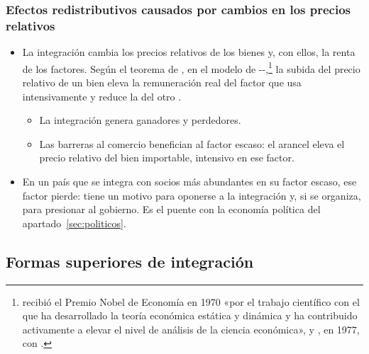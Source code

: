 \documentclass[11pt]{article}
\begin{document}
\subsubsection{Efectos redistributivos causados por cambios en los precios relativos}\label{sec:redistributivos}

\begin{itemize}
\item La integración cambia los precios relativos de los bienes y, con ellos, la renta de los factores. Según el teorema de \textcite{StolperSamuelson1941Protection}, en el modelo de --,\footnote{ recibió el Premio Nobel de Economía en 1970 «por el trabajo científico con el que ha desarrollado la teoría económica estática y dinámica y ha contribuido activamente a elevar el nivel de análisis de la ciencia económica»\nocite{Nobel1970Samuelson}, y , en 1977, con \nocite{Nobel1977MeadeOhlin}.} la subida del precio relativo de un bien eleva la remuneración real del factor que usa intensivamente y reduce la del otro .
  \begin{itemize}
  \item La integración genera ganadores y perdedores.
  \item Las barreras al comercio benefician al factor escaso: el arancel eleva el precio relativo del bien importable, intensivo en ese factor.
  \end{itemize}
\item En un país que se integra con socios más abundantes en su factor escaso, ese factor pierde: tiene un motivo para oponerse a la integración y, si se organiza, para presionar al gobierno. Es el puente con la economía política del apartado~\ref{sec:politicos}.
\end{itemize}

\subsection{Formas superiores de integración}\label{sec:formas-superiores}
\end{document}
